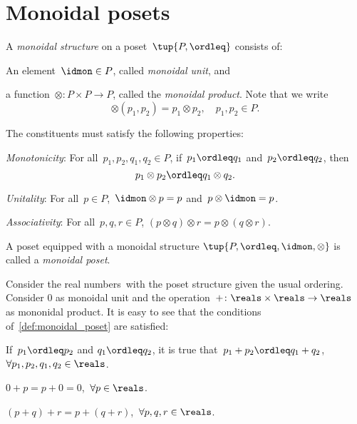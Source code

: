 

\section{Monoidal posets}\label{sec:parallelism-monoidal-posets}

\begin{definition}
  \label{def:monoidal_poset}
  A \emph{monoidal structure} on a poset~$\tup{P,\ordleq}$ consists of:
  \begin{compactenum}
    \item An element~$\idmon\in P$, called \emph{monoidal unit}, and
    \item a function~$\otimes\colon P\times P\to P$, called the \emph{monoidal product}. Note that we write
    \begin{equation*}
      \otimes(p_1,p_2)=p_1\otimes p_2, \quad p_1,p_2\in P.
    \end{equation*}
  \end{compactenum}
  The constituents must satisfy the following properties:
  \begin{compactenum}[(a)]
    \item \emph{Monotonicity}: For all~$p_1,p_2,q_1,q_2\in P$, if~$p_1\ordleq q_1$ and~$p_2\ordleq q_2$, then
    \begin{equation*}
      p_1\otimes p_2\ordleq q_1\otimes q_2.
    \end{equation*}
    \item \emph{Unitality}: For all~$p\in P$,~$\idmon\otimes p=p$ and~$p\otimes \idmon=p$.
    \item \emph{Associativity}: For all~$p,q,r\in P$, $(p\otimes q)\otimes r=p\otimes (q\otimes r)$.
  \end{compactenum}
  A poset equipped with a monoidal structure $\tup{P,\ordleq,\idmon,\otimes}$ is called a \emph{monoidal poset}.
\end{definition}

\begin{example}
  \label{ex:monoidal_pos_reals}
  Consider the real numbers~\reals with the poset structure given the usual ordering. Consider 0 as monoidal unit and the operation~$+\colon \reals\times \reals\to \reals$ as mononidal product. It is easy to see that the conditions of~\cref{def:monoidal_poset} are satisfied:
  \begin{compactenum}[(a)]
    \item If~$p_1\ordleq p_2$ and $q_1\ordleq q_2$, it is true that~$p_1+p_2\ordleq q_1+q_2$,~$\forall p_1,p_2,q_1,q_2\in \reals$.
    \item $0+p=p+0=0$,~$\forall p\in \reals$.
    \item $(p+q)+r=p+(q+r)$,~$\forall p,q,r\in \reals$.
  \end{compactenum}
\end{example}

